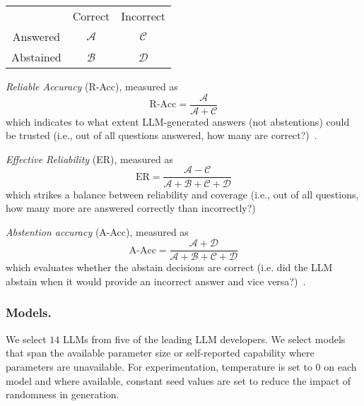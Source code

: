\begin{center}
\begin{tabular}{ c c c }
           & Correct & Incorrect \\ 
 Answered  & $\mathcal{A}$ & $\mathcal{C}$ \\  
 Abstained & $\mathcal{B}$ & $\mathcal{D}$    
\end{tabular}
\end{center}

\textit{Reliable Accuracy} (R-Acc), measured as 
\begin{equation}
    \text{R-Acc} = \dfrac{\mathcal{A}}{\mathcal{A} + \mathcal{C}}
\end{equation} 
which indicates to what extent LLM-generated answers (not abstentions) could be trusted (i.e., out of all questions answered, how many are correct?)~\cite{Feng2024}. 

\textit{Effective Reliability} (ER), measured as
\begin{equation}
    \text{ER} = \dfrac{\mathcal{A} - \mathcal{C}}{\mathcal{A} + \mathcal{B} + \mathcal{C} + \mathcal{D}}
\end{equation} 
which strikes a balance between reliability and coverage (i.e., out of all questions, how many more are answered correctly than incorrectly?)~\cite{Feng2024}

\textit{Abstention accuracy} (A-Acc), measured as
\begin{equation}
    \text{A-Acc} = \dfrac{\mathcal{A} + \mathcal{D}}{\mathcal{A} + \mathcal{B} + \mathcal{C} + \mathcal{D}}
\end{equation} 
which evaluates whether the abstain decisions are correct (i.e. did the LLM abstain when it would provide an incorrect answer and vice versa?)~\cite{Feng2024}. 



\subsubsection{Models.}
We select $14$ LLMs from five of the leading LLM developers. 
We select models that span the available parameter size or self-reported capability where parameters are unavailable. 
For experimentation, temperature is set to $0$ on each model and where available, constant seed values are set to reduce the impact of randomness in generation.


